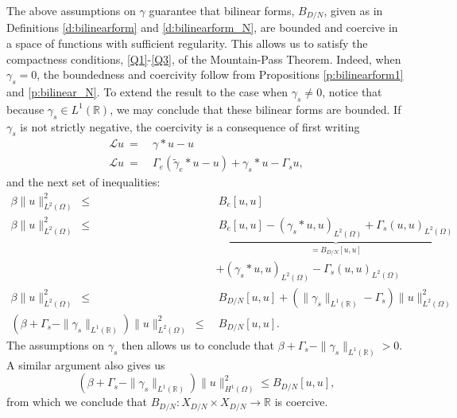 \documentclass[11pt]{amsart}   	%
\theoremstyle{plain}
\numberwithin{equation}{section}
\def\R{\mathbb{R}}
\begin{document}
The above assumptions on $\gamma$ guarantee that  bilinear forms, $B_{D/N}$, given as in Definitions \ref{d:bilinearform} and \ref{d:bilinearform_N},
are bounded and coercive in a space of functions with sufficient regularity. This allows us to satisfy the compactness conditions, \ref{Q1}-\ref{Q3}, of the Mountain-Pass Theorem.  
Indeed, when $\gamma_s =0$, the boundedness and coercivity follow from  Propositions \ref{p:bilinearform1} and \ref{p:bilinear_N}.
To extend the result to the case when $\gamma_s \neq 0$, notice that because $\gamma_s \in L^1(\R)$, we may conclude that these bilinear forms are bounded. If $\gamma_s$ is not strictly negative, the coercivity is a consequence of first writing
\begin{align*}
 \mathcal{L} u \ = & \  \gamma \ast u - u \\
\mathcal{L} u \ = & \ \Gamma_e ( \tilde{\gamma}_e \ast u - u) + \gamma_s \ast u - \Gamma_s u,
 \end{align*}
and the next set of inequalities:
\begin{align*}
\beta \| u\|^2_{L^2(\Omega)} \ \leq & \ B_e[u,u]\\
\beta \| u\|^2_{L^2(\Omega)}  \ \leq & \ \underbrace{ B_e[u,u]  -  (\gamma_s \ast u, u)_{L^2(\Omega)} +\Gamma_s (u,u)_{L^2(\Omega)} }_{=B_{D/N}[u,u]}\\
& + (\gamma_s \ast u, u)_{L^2(\Omega)} - \Gamma_s (u,u)_{L^2(\Omega)}\\
\beta  \| u\|^2_{L^2(\Omega)}  \ \leq & \ B_{D/N} [u,u] +(  \| \gamma_s\|_{L^1(\R)} - \Gamma_s )  \| u\|^2_{L^2(\Omega)}  \\
(\beta + \Gamma_s - \| \gamma_s\|_{L^1(\R)} )   \| u\|^2_{L^2(\Omega)}  \ \leq & \ B_{D/N} [u,u].
\end{align*}
The assumptions on $\gamma_s$ then allows us to conclude that $\beta + \Gamma_s - \| \gamma_s\|_{L^1(\R)}  >0$.
A similar argument also gives us
\[ (\beta +\Gamma_s  - \| \gamma_s\|_{L^1(\R)} )   \| u\|^2_{H^1 (\Omega)}   \leq  B_{D/N}[u,u],\]
from which we conclude that $B_{D/N}: X_{D/N} \times X_{D/N} \longrightarrow \R$ is coercive. 
\end{document}

